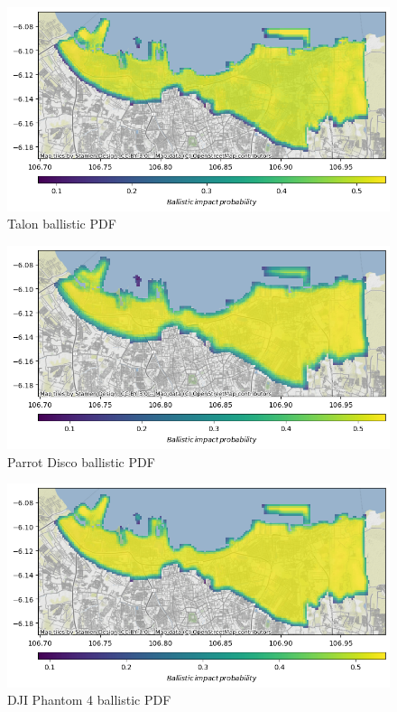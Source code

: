 \documentclass[12pt]{report}
\begin{document}
        \begin{figure}[H]
            \centering
            \includegraphics[width=\textwidth]{Plot/talon/ballistic_fpdf.png}
            \caption{Talon ballistic PDF}
            \label{fig:talon_ballistic}
        \end{figure}
        \begin{figure}[H]
            \centering
            \includegraphics[width=\textwidth]{Plot/parrot/ballistic_pdf.png}
            \caption{Parrot Disco ballistic PDF}
            \label{fig:disco_ballistic}
        \end{figure}
        \begin{figure}[H]
            \centering
            \includegraphics[width=\textwidth]{Plot/phantom4/ballistic_pdf.png}
            \caption{DJI Phantom 4 ballistic PDF}
            \label{fig:phantom_ballistic}
        \end{figure}
\end{document}
